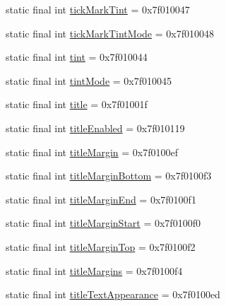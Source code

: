 \begin{CompactItemize}
\item 
static final int \hyperlink{classandroid_1_1support_1_1graphics_1_1drawable_1_1_r_1_1attr_e585f8fde2b85f5ffd1eb20baf216189}{tickMarkTint} = 0x7f010047
\item 
static final int \hyperlink{classandroid_1_1support_1_1graphics_1_1drawable_1_1_r_1_1attr_b7540ea2807fac282fea404f1f6dbf44}{tickMarkTintMode} = 0x7f010048
\item 
static final int \hyperlink{classandroid_1_1support_1_1graphics_1_1drawable_1_1_r_1_1attr_3eb5334d229742d1e7919875b5f23c93}{tint} = 0x7f010044
\item 
static final int \hyperlink{classandroid_1_1support_1_1graphics_1_1drawable_1_1_r_1_1attr_1a4319636ee63a6547c1a232d01f9f3d}{tintMode} = 0x7f010045
\item 
static final int \hyperlink{classandroid_1_1support_1_1graphics_1_1drawable_1_1_r_1_1attr_897da4282a93112d61ca577322523470}{title} = 0x7f01001f
\item 
static final int \hyperlink{classandroid_1_1support_1_1graphics_1_1drawable_1_1_r_1_1attr_f5de8202959dc30d56f4e313f80076ea}{titleEnabled} = 0x7f010119
\item 
static final int \hyperlink{classandroid_1_1support_1_1graphics_1_1drawable_1_1_r_1_1attr_3d95b77c3f7bd99531127582198e5d8f}{titleMargin} = 0x7f0100ef
\item 
static final int \hyperlink{classandroid_1_1support_1_1graphics_1_1drawable_1_1_r_1_1attr_5d0d0ea3393b2ccb4a0d9155bced8e76}{titleMarginBottom} = 0x7f0100f3
\item 
static final int \hyperlink{classandroid_1_1support_1_1graphics_1_1drawable_1_1_r_1_1attr_7aab571fbd38c60fb7d367a30a199ee9}{titleMarginEnd} = 0x7f0100f1
\item 
static final int \hyperlink{classandroid_1_1support_1_1graphics_1_1drawable_1_1_r_1_1attr_c370dc8dab6f707ff6c5a751eb03a4fc}{titleMarginStart} = 0x7f0100f0
\item 
static final int \hyperlink{classandroid_1_1support_1_1graphics_1_1drawable_1_1_r_1_1attr_bbeea2a076224280bee046a63cefd2c5}{titleMarginTop} = 0x7f0100f2
\item 
static final int \hyperlink{classandroid_1_1support_1_1graphics_1_1drawable_1_1_r_1_1attr_696b83c66cd9e6107a2db7402bf54f9c}{titleMargins} = 0x7f0100f4
\item 
static final int \hyperlink{classandroid_1_1support_1_1graphics_1_1drawable_1_1_r_1_1attr_fac47330583f8a0d9e4d787094e77fdb}{titleTextAppearance} = 0x7f0100ed
\item 

\end{CompactItemize}
